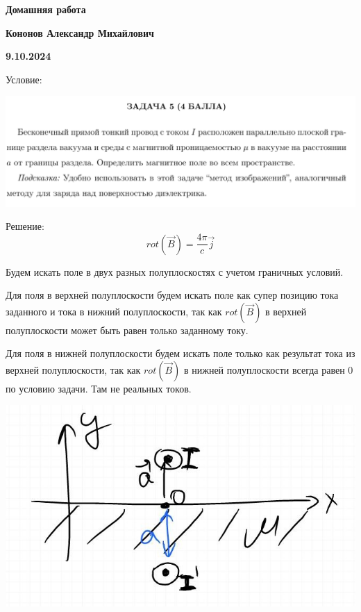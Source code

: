 \documentclass[12pt]{article}
\begin{document}
\begin{large}
\begin{center}
\LARGE \textbf{Домашняя работа}
\par
\LARGE \textbf{Кононов Александр Михайлович}
\par
    \textbf{9.10.2024}
\end{center}
\par Условие:
\par
\includegraphics[width=1\textwidth]{photo.png}
\par Решение:
\[
    rot\left( \overrightarrow{B} \right) = \frac{4\pi}{c}\vec{j}
\]
\par Будем искать поле в двух разных полуплоскостях с учетом граничных условий.
\par Для поля в верхней полуплоскости будем искать поле как супер позицию тока заданного и тока в нижний полуплоскости, так как $ rot\left( \overrightarrow{B} \right)$ в верхней полуплоскости может быть равен только заданному току.
\par Для поля в нижней полуплоскости будем искать поле только как результат тока из верхней полуплоскости, так как $ rot\left( \overrightarrow{B} \right)$ в нижней полуплоскости всегда равен $0$ по условию задачи. Там не реальных токов.
\par
\includegraphics[width=1\textwidth]{photo_1.jpg}

\end{large}
\end{document}
